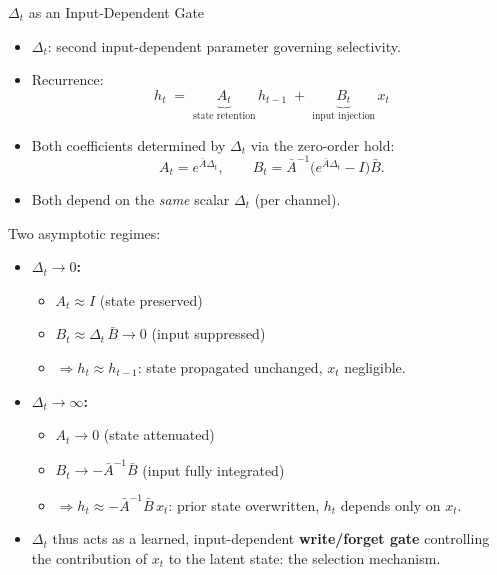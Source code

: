 \begin{frame}{$\Delta_t$ as an Input-Dependent Gate}

  \begin{itemize}
    \item $\Delta_t$: second input-dependent parameter governing selectivity.
    \item Recurrence:
      \[
        h_t \;=\; \underbrace{A_t}_{\text{state retention}}\, h_{t-1} \;+\; \underbrace{B_t}_{\text{input injection}}\, x_t
      \]
    \item Both coefficients determined by $\Delta_t$ via the zero-order hold:
      \[
        A_t = e^{\bar{A}\Delta_t}, \qquad B_t = \bar{A}^{-1}\bigl(e^{\bar{A}\Delta_t} - I\bigr)\bar{B}.
      \]
    \item Both depend on the \emph{same} scalar $\Delta_t$ (per channel).
  \end{itemize}

  Two asymptotic regimes:

  \begin{itemize}
    \item \textbf{$\Delta_t \to 0$:}
      \begin{itemize}
        \item $A_t \approx I$ \hfill (state preserved)
        \item $B_t \approx \Delta_t\,\bar{B} \to 0$ \hfill (input suppressed)
        \item $\Rightarrow h_t \approx h_{t-1}$: state propagated unchanged, $x_t$ negligible.
      \end{itemize}
    \item \textbf{$\Delta_t \to \infty$:}
      \begin{itemize}
        \item $A_t \to 0$ \hfill (state attenuated)
        \item $B_t \to -\bar{A}^{-1}\bar{B}$ \hfill (input fully integrated)
        \item $\Rightarrow h_t \approx -\bar{A}^{-1}\bar{B}\, x_t$: prior state overwritten, $h_t$ depends only on $x_t$.
      \end{itemize}
    \item $\Delta_t$ thus acts as a learned, input-dependent \textbf{write/forget gate} controlling the contribution of $x_t$ to the latent state: the selection mechanism.
  \end{itemize}
\end{frame}

